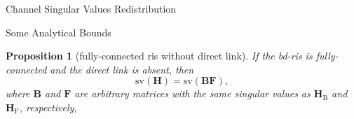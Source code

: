 \documentclass[journal]{IEEEtran}
\newtheorem{proposition}{Proposition}
\begin{document}
\begin{section}{Channel Singular Values Redistribution}
\begin{subsection}{Some Analytical Bounds}
		\begin{proposition}[fully-connected \gls{ris} without direct link]
			If the \gls{bd}-\gls{ris} is fully-connected and the direct link is absent, then
			\begin{equation}
				\mathrm{sv}(\mathbf{H}) = \mathrm{sv}(\mathbf{BF}),
			\end{equation}
			where $\mathbf{B}$ and $\mathbf{F}$ are arbitrary matrices with the same singular values as $\mathbf{H}_\mathrm{B}$ and $\mathbf{H}_\mathrm{F}$, respectively,
		\end{proposition}


\end{subsection}
\end{section}
\end{document}
